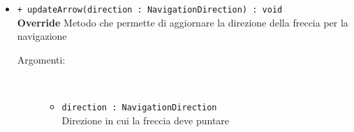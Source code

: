 \documentclass[../DefinizioneDiProdotto.tex]{subfiles}
\begin{document}
\begin{description}
\begin{itemize}
\begin{description}
		\end{description}
		\item \texttt{+ updateArrow(direction : NavigationDirection) : void}\\
		\textbf{Override} Metodo che permette di aggiornare la direzione della freccia per la navigazione
		\begin{description}
			\item[Argomenti:] \
			\begin{itemize}
				\item \texttt{direction : NavigationDirection}\\
				Direzione in cui la freccia deve puntare\end{itemize}
		\end{description}
	\end{itemize}
\end{description}
\end{document}
